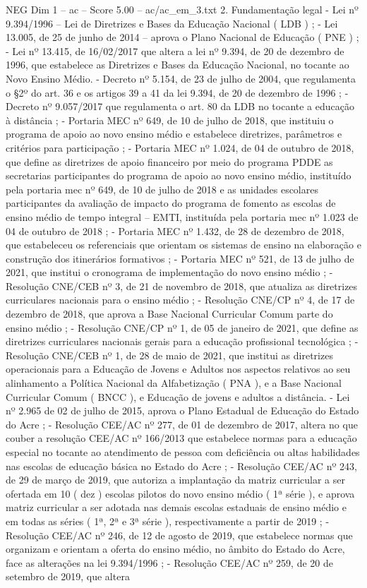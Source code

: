\begin{textsample}{NEG Dim 1 – ac – Score 5.00 – ac/ac\_em\_3.txt}  \label{ex:f1_neg_118}
2.
Fundamentação legal - Lei nº 9.394/1996 – Lei de Diretrizes e Bases da Educação Nacional ( LDB ) ; - Lei 13.005, de 25 de junho de 2014 – aprova o Plano Nacional de Educação ( PNE ) ; - Lei nº 13.415, de 16/02/2017 que altera a lei nº 9.394, de 20 de dezembro de 1996, que estabelece as Diretrizes e Bases da Educação Nacional, no tocante ao Novo Ensino Médio. - Decreto nº 5.154, de 23 de julho de 2004, que regulamenta o §2º do art. 36 e os artigos 39 a 41 da lei 9.394, de 20 de dezembro de 1996 ; - Decreto nº 9.057/2017 que regulamenta o art. 80 da LDB no tocante a educação à distância ; - Portaria MEC nº 649, de 10 de julho de 2018, que instituiu o programa de apoio ao novo ensino médio e estabelece diretrizes, parâmetros e critérios para participação ; - Portaria MEC nº 1.024, de 04 de outubro de 2018, que define as diretrizes de apoio financeiro por meio do programa PDDE as secretarias participantes do programa de apoio ao novo ensino médio, instituído pela portaria mec nº 649, de 10 de julho de 2018 e as unidades escolares participantes da avaliação de impacto do programa de fomento as escolas de ensino médio de tempo integral – EMTI, instituída pela portaria mec nº 1.023 de 04 de outubro de 2018 ; - Portaria MEC nº 1.432, de 28 de dezembro de 2018, que estabeleceu os referenciais que orientam os sistemas de ensino na elaboração e construção dos itinerários formativos ; - Portaria MEC nº 521, de 13 de julho de 2021, que institui o cronograma de implementação do novo ensino médio ; - Resolução CNE/CEB nº 3, de 21 de novembro de 2018, que atualiza as diretrizes curriculares nacionais para o ensino médio ; - Resolução CNE/CP nº 4, de 17 de dezembro de 2018, que aprova a Base Nacional Curricular Comum parte do ensino médio ; - Resolução CNE/CP nº 1, de 05 de janeiro de 2021, que define as diretrizes curriculares nacionais gerais para a educação profissional tecnológica ; - Resolução CNE/CEB nº 1, de 28 de maio de 2021, que institui as diretrizes operacionais para a Educação de Jovens e Adultos nos aspectos relativos ao seu alinhamento a Política Nacional da Alfabetização ( PNA ), e a Base Nacional Curricular Comum ( BNCC ), e Educação de jovens e adultos a distância. - Lei nº 2.965 de 02 de julho de 2015, aprova o Plano Estadual de Educação do Estado do Acre ; - Resolução CEE/AC nº 277, de 01 de dezembro de 2017, altera no que couber a resolução CEE/AC nº 166/2013 que estabelece normas para a educação especial no tocante ao atendimento de pessoa com deficiência ou altas habilidades nas escolas de educação básica no Estado do Acre ; - Resolução CEE/AC nº 243, de 29 de março de 2019, que autoriza a implantação da matriz curricular a ser ofertada em 10 ( dez ) escolas pilotos do novo ensino médio ( 1ª série ), e aprova matriz curricular a ser adotada nas demais escolas estaduais de ensino médio e em todas as séries ( 1ª, 2ª e 3ª série ), respectivamente a partir de 2019 ; - Resolução CEE/AC nº 246, de 12 de agosto de 2019, que estabelece normas que organizam e orientam a oferta do ensino médio, no âmbito do Estado do Acre, face as alterações na lei 9.394/1996 ; - Resolução CEE/AC nº 259, de 20 de setembro de 2019, que altera 
\end{textsample}
